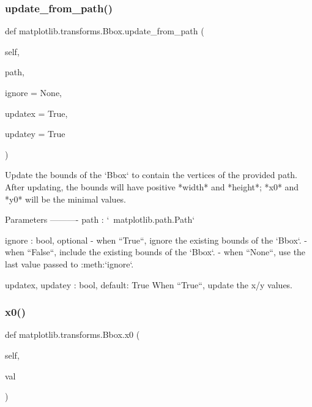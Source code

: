 \subsubsection{\texorpdfstring{update\+\_\+from\+\_\+path()}{update\_from\_path()}}
{\footnotesize\ttfamily def matplotlib.\+transforms.\+Bbox.\+update\+\_\+from\+\_\+path (\begin{DoxyParamCaption}\item[{}]{self,  }\item[{}]{path,  }\item[{}]{ignore = {\ttfamily None},  }\item[{}]{updatex = {\ttfamily True},  }\item[{}]{updatey = {\ttfamily True} }\end{DoxyParamCaption})}

\begin{DoxyVerb}Update the bounds of the `Bbox` to contain the vertices of the
provided path. After updating, the bounds will have positive *width*
and *height*; *x0* and *y0* will be the minimal values.

Parameters
----------
path : `~matplotlib.path.Path`

ignore : bool, optional
   - when ``True``, ignore the existing bounds of the `Bbox`.
   - when ``False``, include the existing bounds of the `Bbox`.
   - when ``None``, use the last value passed to :meth:`ignore`.

updatex, updatey : bool, default: True
    When ``True``, update the x/y values.
\end{DoxyVerb}
 \mbox{\label{classmatplotlib_1_1transforms_1_1Bbox_a2205c0684b77bfbc2c7a053a0bda7fda}} 
\subsubsection{\texorpdfstring{x0()}{x0()}}
{\footnotesize\ttfamily def matplotlib.\+transforms.\+Bbox.\+x0 (\begin{DoxyParamCaption}\item[{}]{self,  }\item[{}]{val }\end{DoxyParamCaption})}

\mbox{\label{classmatplotlib_1_1transforms_1_1Bbox_aef16e2063a7335c6e768c35079244341}} 
